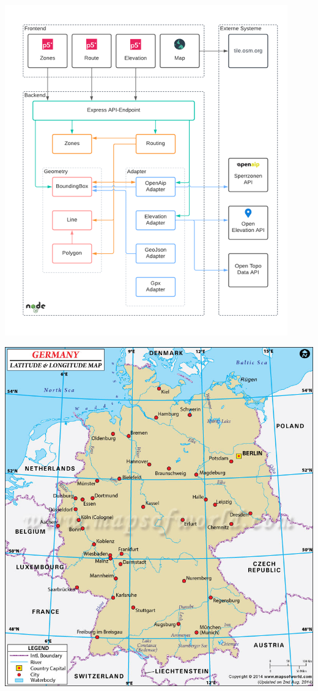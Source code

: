 \begin{center}
    \includegraphics[width=\columnwidth]{images/architektur}
    \label{fig:REPLACE}
\end{center}

\begin{center}
    \includegraphics[width=\columnwidth]{images/map-germany}
    \label{fig:REPLACE}
\end{center}

